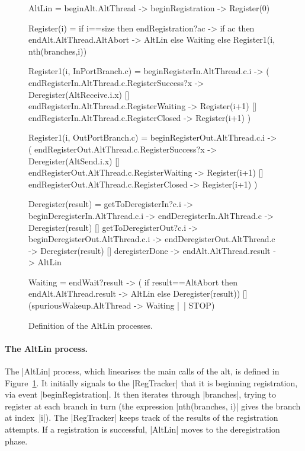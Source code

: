 \begin{figure}
\begin{cspm}
AltLin = beginAlt.AltThread -> beginRegistration -> Register(0)
  
Register(i) = 
  if i==size then endRegistration?ac -> 
    if ac then endAlt.AltThread.AltAbort -> AltLin else Waiting
  else Register1(i, nth(branches,i))
  
Register1(i, InPortBranch.c) = 
  beginRegisterIn.AltThread.c.i -> (
    endRegisterIn.AltThread.c.RegisterSuccess?x -> Deregister(AltReceive.i.x)
    [] endRegisterIn.AltThread.c.RegisterWaiting -> Register(i+1)
    [] endRegisterIn.AltThread.c.RegisterClosed -> Register(i+1)
  )

Register1(i, OutPortBranch.c) =
  beginRegisterOut.AltThread.c.i -> (
    endRegisterOut.AltThread.c.RegisterSuccess?x -> Deregister(AltSend.i.x)
    [] endRegisterOut.AltThread.c.RegisterWaiting -> Register(i+1)
    [] endRegisterOut.AltThread.c.RegisterClosed -> Register(i+1)
  )
  
Deregister(result) =
  getToDeregisterIn?c.i -> beginDeregisterIn.AltThread.c.i -> 
     endDeregisterIn.AltThread.c -> Deregister(result)
  [] getToDeregisterOut?c.i -> beginDeregisterOut.AltThread.c.i ->
     endDeregisterOut.AltThread.c -> Deregister(result)
  [] deregisterDone -> endAlt.AltThread.result -> AltLin
  
Waiting = 
  endWait?result -> (
    if result==AltAbort then endAlt.AltThread.result -> AltLin
    else Deregister(result))
  [] (spuriousWakeup.AltThread -> Waiting |~| STOP)
\end{cspm}
\caption{Definition of the {\scalastyle AltLin}
  processes.  \label{fig:AltLin}} 
\end{figure}


\paragraph{The {\scalashape AltLin} process.}

The |AltLin| process, which linearises the main calls of the alt, is defined
in Figure~\ref{fig:AltLin}. It initially signals to the |RegTracker| that it
is beginning registration, via event |beginRegistration|.  It then iterates
through |branches|, trying to register at each branch in turn (the expression
|nth(branches, i)| gives the branch at index~|i|).  The |RegTracker| keeps
track of the results of the registration attempts.  If a registration is
successful, |AltLin| moves to the deregistration phase.  

